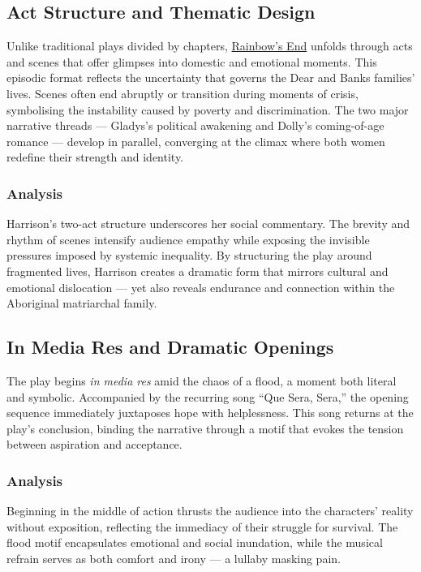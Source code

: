 \documentclass[a4paper]{article}
\begin{document}
\subsection{Act Structure and Thematic Design}
Unlike traditional plays divided by chapters, \underline{Rainbow's End} unfolds through acts and scenes that offer glimpses into domestic and emotional moments. This episodic format reflects the uncertainty that governs the Dear and Banks families’ lives. Scenes often end abruptly or transition during moments of crisis, symbolising the instability caused by poverty and discrimination. The two major narrative threads — Gladys’s political awakening and Dolly’s coming-of-age romance — develop in parallel, converging at the climax where both women redefine their strength and identity.\\

\subsubsection{Analysis}
Harrison’s two-act structure underscores her social commentary. The brevity and rhythm of scenes intensify audience empathy while exposing the invisible pressures imposed by systemic inequality. By structuring the play around fragmented lives, Harrison creates a dramatic form that mirrors cultural and emotional dislocation — yet also reveals endurance and connection within the Aboriginal matriarchal family.\\

\subsection{In Media Res and Dramatic Openings}
The play begins \textit{in media res} amid the chaos of a flood, a moment both literal and symbolic. Accompanied by the recurring song “Que Sera, Sera,” the opening sequence immediately juxtaposes hope with helplessness. This song returns at the play’s conclusion, binding the narrative through a motif that evokes the tension between aspiration and acceptance.\\

\subsubsection{Analysis}
Beginning in the middle of action thrusts the audience into the characters’ reality without exposition, reflecting the immediacy of their struggle for survival. The flood motif encapsulates emotional and social inundation, while the musical refrain serves as both comfort and irony — a lullaby masking pain.\\
\end{document}
